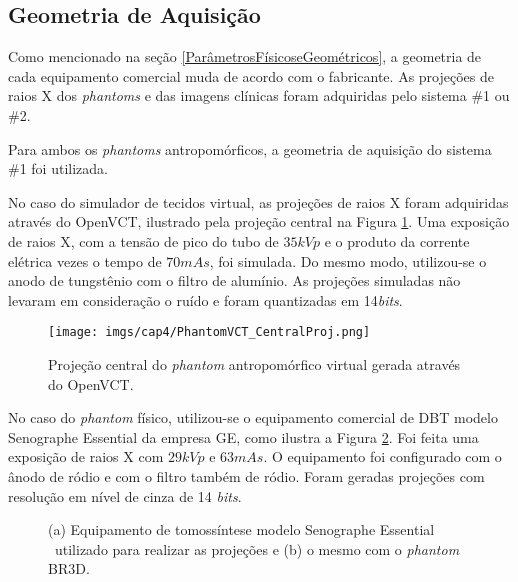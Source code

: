 \subsection{Geometria de Aquisição} 


Como mencionado na seção \ref{ParâmetrosFísicoseGeométricos}, a geometria de cada equipamento comercial muda de acordo com o fabricante. As projeções de raios X dos \textit{phantoms} e das imagens clínicas foram adquiridas pelo sistema \#1 ou \#2. 

Para ambos os \textit{phantoms} antropomórficos, a geometria de aquisição do sistema \#1 foi utilizada. 

No caso do simulador de tecidos virtual, as projeções de raios X foram adquiridas através do OpenVCT, ilustrado pela projeção central na Figura \ref{fig:imgCap4PhantomVCT_CentralProj}. Uma exposição de raios X, com a tensão de pico do tubo de $35kVp$ e o produto da corrente elétrica vezes o tempo de $70mAs$, foi simulada. Do mesmo modo, utilizou-se o anodo de tungstênio com o filtro de alumínio. As projeções simuladas não levaram em consideração o ruído e foram quantizadas em 14\textit{bits}.

\begin{figure}[htb]
	\caption{Projeção central do \textit{phantom} antropomórfico virtual gerada através do OpenVCT.}
	\begin{center}
		\texttt{[image: imgs/cap4/PhantomVCT\_CentralProj.png]}
	\end{center}
	\label{fig:imgCap4PhantomVCT_CentralProj}
\end{figure} 

No caso do \textit{phantom} físico, utilizou-se  o equipamento comercial de \acs{DBT} modelo Senographe Essential{\footnotesize \texttrademark} \space da empresa \acs{GE}, como ilustra a Figura \ref{fig:imgCap4EquipamentoGE}. Foi feita uma exposição de raios X com $29kVp$ e $63mAs$. O equipamento foi configurado com o ânodo de ródio e com o filtro também de ródio. Foram geradas projeções com resolução em nível de cinza de 14 \textit{bits}.

\begin{figure}[htb]
	\centering
	
	\caption{(a) Equipamento de tomossíntese modelo Senographe Essential{\footnotesize \texttrademark} \ utilizado para realizar as projeções e (b) o mesmo com o \textit{phantom} BR3D.}
	
	\hfil
	
	\label{fig:imgCap4EquipamentoGE}
\end{figure} 


